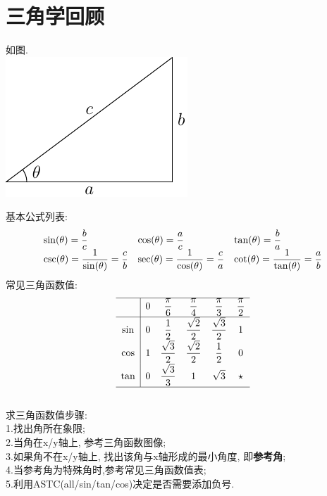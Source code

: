 \chapter{三角学回顾}
如图.\\
\includegraphics{triangel.pdf}

基本公式列表:
\begin{equation*}
\begin{array}{l l l}
    \displaystyle\sin(\theta)=\frac{b}{c} & \displaystyle\cos(\theta)=\frac{a}{c} & \displaystyle\tan(\theta)=\frac{b}{a}\\
    \displaystyle\csc(\theta)=\frac{1}{\sin(\theta)}=\frac{c}{b} & \displaystyle\sec(\theta)=\frac{1}{\cos(\theta)}=\frac{c}{a} & \displaystyle\cot(\theta)=\frac{1}{\tan(\theta)}=\frac{a}{b}
\end{array}
\end{equation*}
常见三角函数值:\\
\begin{equation*}
\begin{array}{>{\displaystyle}c|>{\displaystyle}c >{\displaystyle}c >{\displaystyle}c >{\displaystyle}c >{\displaystyle}c}
\hline
    & 0 & \frac{\pi}{6} & \frac{\pi}{4} & \frac{\pi}{3} & \frac{\pi}{2}\\[1ex]
\hline
    \sin & 0 & \frac{1}{2} & \frac{\sqrt{2}}{2} & \frac{\sqrt{3}}{2} & 1\\[1ex]
    \cos & 1 & \frac{\sqrt{3}}{2} & \frac{\sqrt{2}}{2} & \frac{1}{2} & 0\\[1ex]
    \tan & 0 & \frac{\sqrt{3}}{3} & 1 & \sqrt{3} & \star\\[1ex]
\hline
\end{array}
\end{equation*}\\

求三角函数值步骤:\\
1.找出角所在象限;\\
2.当角在x/y轴上, 参考三角函数图像;\\
3.如果角不在x/y轴上, 找出该角与x轴形成的最小角度, 即\textbf{参考角};\\
4.当参考角为特殊角时,参考常见三角函数值表;\\
5.利用ASTC(all/sin/tan/cos)决定是否需要添加负号.\\

